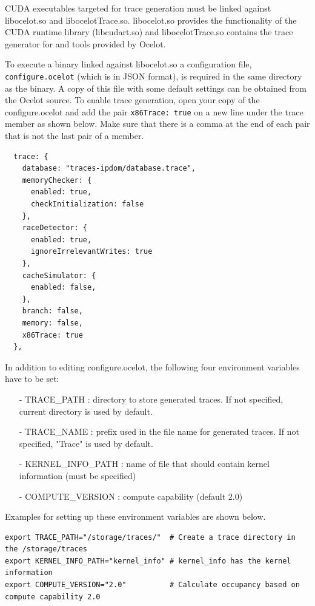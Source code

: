 CUDA executables targeted for trace generation must be linked against
libocelot.so and libocelotTrace.so. libocelot.so provides the functionality of
the CUDA runtime library (libcudart.so) and libocelotTrace.so contains the
trace generator for \SIM and tools provided by Ocelot.

To execute a binary linked against libocelot.so a configuration file,
\Verb+configure.ocelot+ (which is in JSON format), is required in the same
directory as the binary. A copy of this file with some default settings can
be obtained from the Ocelot source. To enable trace generation, open your
copy of the configure.ocelot and add the pair \Verb+x86Trace: true+ on a new
line under the trace member as shown below.  Make sure that there is a comma
at the end of each pair that is not the last pair of a member.

\begin{Verbatim}
  trace: {
    database: "traces-ipdom/database.trace",
    memoryChecker: {
      enabled: true,
      checkInitialization: false
    },
    raceDetector: {
      enabled: true,
      ignoreIrrelevantWrites: true
    },
    cacheSimulator: {
      enabled: false,
    },
    branch: false,
    memory: false,
    x86Trace: true
  },
\end{Verbatim}

In addition to editing configure.ocelot, the following four environment
variables have to be set:

\begin{itemize}\itemsep2pt
\item[-] TRACE\_PATH : directory to store generated traces. If not specified, current directory is used by default.
\item[-] TRACE\_NAME : prefix used in the file name for generated traces. If not specified, "Trace" is used by default.
\item[-] KERNEL\_INFO\_PATH : name of file that should contain kernel information (must be specified)
\item[-] COMPUTE\_VERSION : compute capability (default 2.0)
\end{itemize}


Examples for setting up these environment variables are shown below.

\begin{Verbatim}
export TRACE_PATH="/storage/traces/"  # Create a trace directory in the /storage/traces
export KERNEL_INFO_PATH="kernel_info" # kernel_info has the kernel information
export COMPUTE_VERSION="2.0"          # Calculate occupancy based on compute capability 2.0
\end{Verbatim}

